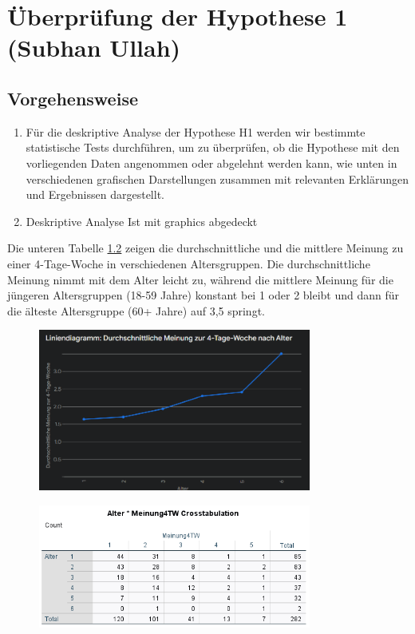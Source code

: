 \chapter{Überprüfung der Hypothese 1 (Subhan Ullah)}
\label{chap:hypothese1}

\section{Vorgehensweise}

\begin{enumerate}
    \item Für die deskriptive Analyse der Hypothese H1 werden wir bestimmte statistische Tests 
    durchführen, um zu überprüfen, ob die Hypothese mit den vorliegenden Daten angenommen oder 
    abgelehnt werden kann, wie unten in verschiedenen grafischen Darstellungen zusammen mit 
    relevanten Erklärungen und Ergebnissen dargestellt.
    \item Deskriptive Analyse Ist mit graphics abgedeckt
\end{enumerate}

Die unteren Tabelle \ref*{fig:h1_tabelle_alter} zeigen die durchschnittliche und die mittlere Meinung zu einer 4-Tage-Woche 
in verschiedenen Altersgruppen. Die durchschnittliche Meinung nimmt mit dem Alter leicht zu, 
während die mittlere Meinung für die jüngeren Altersgruppen (18-59 Jahre) konstant bei 1 oder 2 
bleibt und dann für die älteste Altersgruppe (60+ Jahre) auf 3,5 springt.

\begin{figure}[h]
    \centering
    \includegraphics[width=0.8\textwidth]{04_Artefakte/01_Abbildungen/hypothese_1/h1_linie_alter.png}
     \caption{}
     \label{fig:h1_linie_alter}
\end{figure}

\begin{figure}[h]
    \centering
    \includegraphics[width=0.8\textwidth]{04_Artefakte/01_Abbildungen/hypothese_1/h1_tabelle_alter.png}
    \caption{}
    \label{fig:h1_tabelle_alter}
\end{figure}

